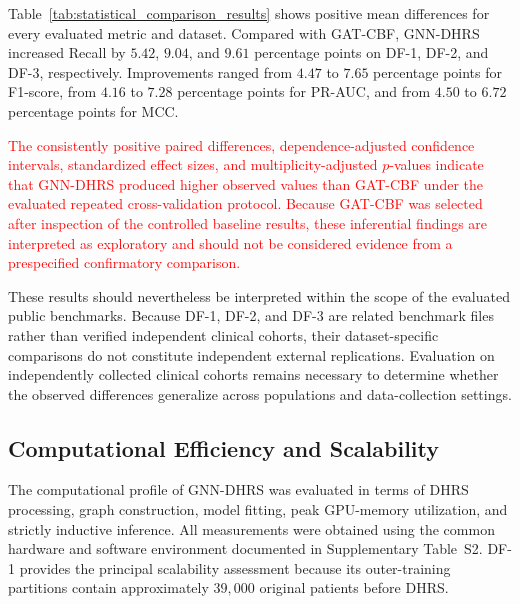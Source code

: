 \documentclass[pdflatex,sn-mathphys-num]{sn-jnl}%
\theoremstyle{thmstyleone}%
\theoremstyle{thmstyletwo}%
\theoremstyle{thmstylethree}%
\begin{document}
Table~\ref{tab:statistical_comparison_results} shows positive mean differences
for every evaluated metric and dataset. Compared with GAT-CBF, GNN-DHRS
increased Recall by \(5.42\), \(9.04\), and \(9.61\) percentage points on
DF-1, DF-2, and DF-3, respectively. Improvements ranged from \(4.47\) to
\(7.65\) percentage points for F1-score, from \(4.16\) to \(7.28\) percentage
points for PR-AUC, and from \(4.50\) to \(6.72\) percentage points for MCC.

 {
\textcolor{red}{
The consistently positive paired differences, dependence-adjusted confidence
intervals, standardized effect sizes, and multiplicity-adjusted \(p\)-values
indicate that GNN-DHRS produced higher observed values than GAT-CBF under the
evaluated repeated cross-validation protocol. Because GAT-CBF was selected
after inspection of the controlled baseline results, these inferential
findings are interpreted as exploratory and should not be considered evidence
from a prespecified confirmatory comparison.
}

 {
These results should nevertheless be interpreted within the scope of the
evaluated public benchmarks. Because DF-1, DF-2, and DF-3 are related
benchmark files rather than verified independent clinical cohorts, their
dataset-specific comparisons do not constitute independent external
replications. Evaluation on independently collected clinical cohorts remains
necessary to determine whether the observed differences generalize across
populations and data-collection settings.
}
\subsection{Computational Efficiency and Scalability}
\label{subsec:computational_efficiency}

 {
The computational profile of GNN-DHRS was evaluated in terms of DHRS
processing, graph construction, model fitting, peak GPU-memory utilization,
and strictly inductive inference. All measurements were obtained using the
common hardware and software environment documented in Supplementary
Table~S2. DF-1 provides the principal scalability assessment because its
outer-training partitions contain approximately \(39{,}000\) original
patients before DHRS.
}

\begingroup
 
}
\end{document}

